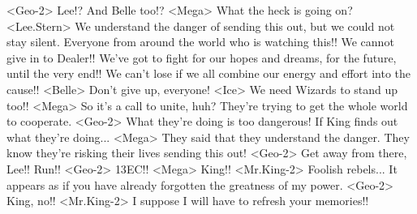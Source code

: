 <Geo-2> Lee!? And Belle too!? 
<Mega> What the heck is going on? 
<Lee.Stern> We understand the danger of sending this out, but we could not stay silent. 
Everyone from around the world who is watching this!! 
We cannot give in to Dealer!! 
We've got to fight for our hopes and dreams, for the future, until the very end!! 
We can't lose if we all combine our energy and effort into the cause!! 
<Belle> Don't give up, everyone! 
<Ice> We need Wizards to stand up too!! 
<Mega> So it's a call to unite, huh? 
They're trying to get the whole world to cooperate. 
<Geo-2> What they're doing is too dangerous! 
If King finds out what they're doing... 
<Mega> They said that they understand the danger. 
They know they're risking their lives sending this out! 
<Geo-2> Get away from there, Lee!! Run!! 
<Geo-2> {13}{EC}!! 
<Mega> King!! 
<Mr.King-2> Foolish rebels... 
It appears as if you have already forgotten the greatness of my power. 
<Geo-2> King, no!! 
<Mr.King-2> I suppose I will have to refresh your memories!! 
